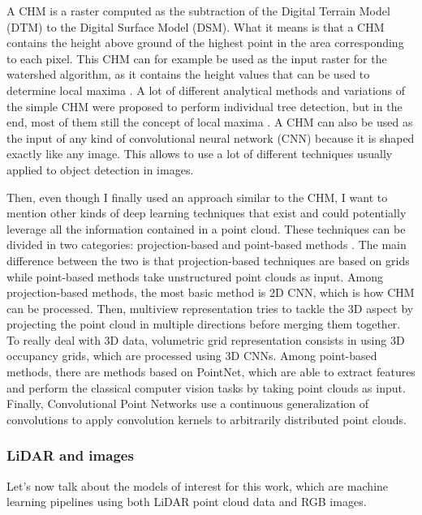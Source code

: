 \documentclass[
  letterpaper,
  DIV=11,
  numbers=noendperiod]{scrartcl}
\begin{document}
A CHM is a raster computed as the subtraction of the Digital Terrain
Model (DTM) to the Digital Surface Model (DSM). What it means is that a
CHM contains the height above ground of the highest point in the area
corresponding to each pixel. This CHM can for example be used as the
input raster for the watershed algorithm, as it contains the height
values that can be used to determine local maxima
\autocite{lidar_watershed}. A lot of different analytical methods and
variations of the simple CHM were proposed to perform individual tree
detection, but in the end, most of them still the concept of local
maxima \autocite{lidar_benchmark,lidar_benchmark_2}. A CHM can also be
used as the input of any kind of convolutional neural network (CNN)
because it is shaped exactly like any image. This allows to use a lot of
different techniques usually applied to object detection in images.

Then, even though I finally used an approach similar to the CHM, I want
to mention other kinds of deep learning techniques that exist and could
potentially leverage all the information contained in a point cloud.
These techniques can be divided in two categories: projection-based and
point-based methods \autocite{lidar_classification}. The main difference
between the two is that projection-based techniques are based on grids
while point-based methods take unstructured point clouds as input. Among
projection-based methods, the most basic method is 2D CNN, which is how
CHM can be processed. Then, multiview representation tries to tackle the
3D aspect by projecting the point cloud in multiple directions before
merging them together. To really deal with 3D data, volumetric grid
representation consists in using 3D occupancy grids, which are processed
using 3D CNNs. Among point-based methods, there are methods based on
PointNet, which are able to extract features and perform the classical
computer vision tasks by taking point clouds as input. Finally,
Convolutional Point Networks use a continuous generalization of
convolutions to apply convolution kernels to arbitrarily distributed
point clouds.

\subsubsection{LiDAR and images}\label{lidar-and-images}

Let's now talk about the models of interest for this work, which are
machine learning pipelines using both LiDAR point cloud data and RGB
images.
\end{document}
